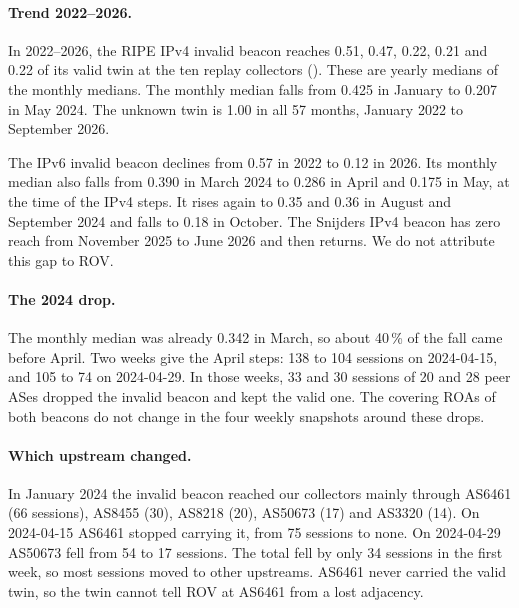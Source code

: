 \paragraph{Trend 2022--2026.}
In 2022--2026, the RIPE IPv4 invalid beacon reaches 0.51, 0.47, 0.22, 0.21 and 0.22 of its valid twin at the ten replay collectors ().
These are yearly medians of the monthly medians.
The monthly median falls from 0.425 in January to 0.207 in May 2024.
The unknown twin is 1.00 in all 57 months, January 2022 to September 2026.

The IPv6 invalid beacon declines from 0.57 in 2022 to 0.12 in 2026.
Its monthly median also falls from 0.390 in March 2024 to 0.286 in April and 0.175 in May, at the time of the IPv4 steps.
It rises again to 0.35 and 0.36 in August and September 2024 and falls to 0.18 in October.
The Snijders IPv4 beacon has zero reach from November 2025 to June 2026 and then returns.
We do not attribute this gap to ROV.

\paragraph{The 2024 drop.}
The monthly median was already 0.342 in March, so about 40\,\% of the fall came before April.
Two weeks give the April steps: 138 to 104 sessions on 2024-04-15, and 105 to 74 on 2024-04-29.
In those weeks, 33 and 30 sessions of 20 and 28 peer ASes dropped the invalid beacon and kept the valid one.
The covering ROAs of both beacons do not change in the four weekly snapshots around these drops.

\paragraph{Which upstream changed.}
In January 2024 the invalid beacon reached our collectors mainly through AS6461 (66 sessions), AS8455 (30), AS8218 (20), AS50673 (17) and AS3320 (14).
On 2024-04-15 AS6461 stopped carrying it, from 75 sessions to none.
On 2024-04-29 AS50673 fell from 54 to 17 sessions.
The total fell by only 34 sessions in the first week, so most sessions moved to other upstreams.
AS6461 never carried the valid twin, so the twin cannot tell ROV at AS6461 from a lost adjacency.

